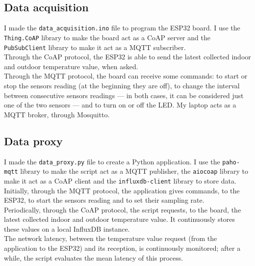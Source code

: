 \documentclass[conference]{IEEEtran}
\begin{document}
\subsection{Data acquisition}
I made the \texttt{data\_acquisition.ino} file to program the ESP32 board. I use the \texttt{Thing.CoAP} library to make the board act as a CoAP server and the \texttt{PubSubClient} library to make it act as a MQTT subscriber.\\
Through the CoAP protocol, the ESP32 is able to send the latest collected indoor and outdoor temperature value, when asked.\\
Through the MQTT protocol, the board can receive some commands: to start or stop the sensors reading (at the beginning they are off), to change the interval between consecutive sensors readings --- in both cases, it can be considered just one of the two sensors --- and to turn on or off the LED. My laptop acts as a MQTT broker, through Mosquitto.

\subsection{Data proxy}
I made the \texttt{data\_proxy.py} file to create a Python application. I use the \texttt{paho-mqtt} library to make the script act as a MQTT publisher, the \texttt{aiocoap} library to make it act as a CoAP client and the \texttt{influxdb-client} library to store data.\\
Initially, through the MQTT protocol, the application gives commands, to the ESP32, to start the sensors reading and to set their sampling rate.\\
Periodically, through the CoAP protocol, the script requests, to the board, the latest collected indoor and outdoor temperature value. It continuously stores these values on a local InfluxDB instance.\\
The network latency, between the temperature value request (from the application to the ESP32) and its reception, is continuously monitored; after a while, the script evaluates the mean latency of this process.
\end{document}
